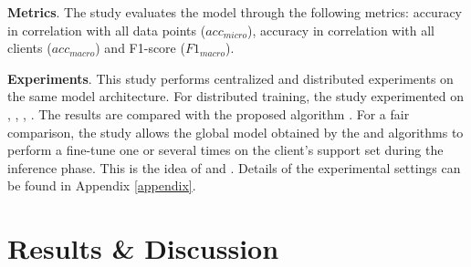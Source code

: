 \documentclass[runningheads]{llncs}
\begin{document}
\begin{table}[h]
    \caption{Statistics on MNIST and CIFAR-10 (non-IID data)}
    \label{tab:stat_noniid_data}
\end{table}

\textbf{Metrics}. The study evaluates the model through the following metrics: accuracy in correlation with all data points ($acc_{micro}$), accuracy in correlation with all clients ($acc_{macro}$) and F1-score ($F1_{macro}$).

\textbf{Experiments}. This study performs centralized and distributed experiments on the same model architecture. For distributed training, the study experimented on , , , . The results are compared with the proposed algorithm . For a fair comparison, the study allows the global model obtained by the  and  algorithms to perform a fine-tune one or several times on the client's support set during the inference phase. This is the idea of  and . Details of the experimental settings can be found in Appendix \ref{appendix}.

\section{Results \& Discussion}
\end{document}

